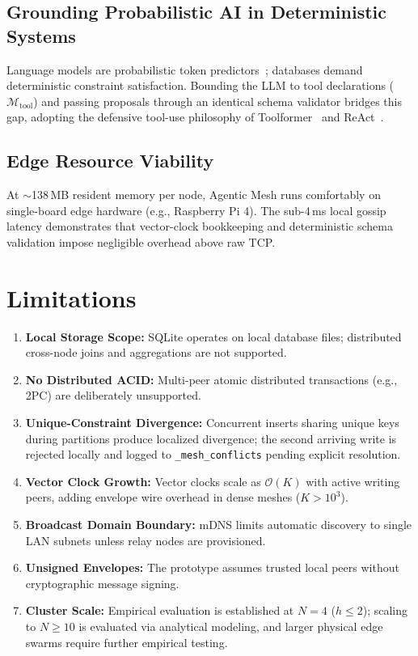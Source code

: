 \subsection{Grounding Probabilistic AI in Deterministic Systems}
Language models are probabilistic token predictors~\cite{ji2023hallucination}; databases demand deterministic constraint satisfaction. Bounding the LLM to tool declarations ($\mathcal{M}_{\text{tool}}$) and passing proposals through an identical schema validator bridges this gap, adopting the defensive tool-use philosophy of Toolformer~\cite{schick2023toolformer} and ReAct~\cite{yao2023react}.

\subsection{Edge Resource Viability}
At $\sim$138\,MB resident memory per node, Agentic Mesh runs comfortably on single-board edge hardware (e.g., Raspberry Pi 4). The sub-4\,ms local gossip latency demonstrates that vector-clock bookkeeping and deterministic schema validation impose negligible overhead above raw TCP.

\section{Limitations}
\label{sec:limitations}

\begin{enumerate}
    \item \textbf{Local Storage Scope:} SQLite operates on local database files; distributed cross-node joins and aggregations are not supported.
    \item \textbf{No Distributed ACID:} Multi-peer atomic distributed transactions (e.g., 2PC) are deliberately unsupported.
    \item \textbf{Unique-Constraint Divergence:} Concurrent inserts sharing unique keys during partitions produce localized divergence; the second arriving write is rejected locally and logged to \texttt{\_mesh\_conflicts} pending explicit resolution.
    \item \textbf{Vector Clock Growth:} Vector clocks scale as $\mathcal{O}(K)$ with active writing peers, adding envelope wire overhead in dense meshes ($K > 10^3$).
    \item \textbf{Broadcast Domain Boundary:} mDNS limits automatic discovery to single LAN subnets unless relay nodes are provisioned.
    \item \textbf{Unsigned Envelopes:} The prototype assumes trusted local peers without cryptographic message signing.
    \item \textbf{Cluster Scale:} Empirical evaluation is established at $N=4$ ($h \le 2$); scaling to $N \ge 10$ is evaluated via analytical modeling, and larger physical edge swarms require further empirical testing.
\end{enumerate}


